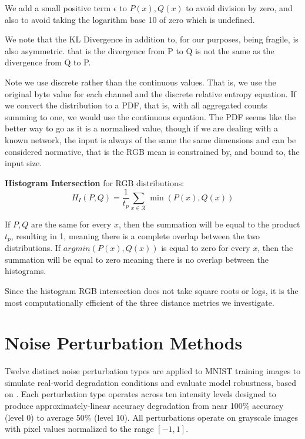 We add a small positive term $ \epsilon $ to $ P(x), Q(x) $ to avoid division by zero, and also to avoid taking the logarithm base 10 of zero which is undefined.

We note that the KL Divergence in addition to, for our purposes, being fragile, is also asymmetric. that is the divergence from P to Q is not the same as the divergence from Q to P.

Note we use discrete rather than the continuous values. That is, we use the original byte value for each channel and the discrete relative entropy equation. If we convert the distribution to a PDF, that is, with all aggregated counts summing to one, we would use the continuous equation. The PDF seems like the better way to go as it is a normalised value, though if we are dealing with a known network, the input is always of the same the same dimensions and can be considered normative, that is the RGB mean is constrained by, and bound to, the input size.

\textbf{Histogram Intersection} for RGB distributions:
\begin{equation}
  H_{I}(P, Q) = \frac{1}{t_p} \sum\limits_{x\in\mathcal{X}}\min(P(x), Q(x))   
\end{equation}

If $P,Q$ are the same for every $ x $, then the summation will be equal to the product $t_p$, resulting in 1, meaning there is a complete overlap between the two distributions. If $argmin(P(x), Q(x))$ is equal to zero for every $x$, then the summation will be equal to zero meaning there is no overlap between the histograms.

Since the histogram RGB intersection does not take square roots or logs, it is the most computationally efficient of the three distance metrics we investigate.

\section{Noise Perturbation Methods}
\label{methods:noise_perturbation}

Twelve distinct noise perturbation types are applied to MNIST training images to simulate real-world degradation conditions and evaluate model robustness, based on \cite{hendrycks2019benchmarking}. Each perturbation type operates across ten intensity levels designed to produce approximately-linear accuracy degradation from near 100\% accuracy (level 0) to average 50\% (level 10). All perturbations operate on grayscale images with pixel values normalized to the range $[-1, 1]$.

